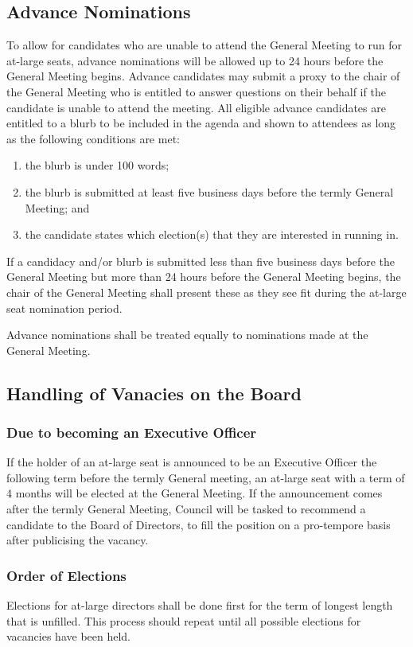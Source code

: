 \subsection{Advance Nominations}
To allow for candidates who are unable to attend the General Meeting to run for at-large seats, advance nominations will be allowed up to 24 hours before the General Meeting begins. 
Advance candidates may submit a proxy to the chair of the General Meeting who is entitled to answer questions on their behalf if the candidate is unable to attend the meeting. 
All eligible advance candidates are entitled to a blurb to be included in the agenda and shown to attendees as long as the following conditions are met: 
\begin{enumerate}
    \item the blurb is under 100 words; 
    \item the blurb is submitted at least five business days before the termly General Meeting; and
    \item the candidate states which election(s) that they are interested in running in.
\end{enumerate}
If a candidacy and/or blurb is submitted less than five business days before the General Meeting but more than 24 hours before the General Meeting begins, the chair of the General Meeting shall present these as they see fit during the at-large seat nomination period. 

\noindent Advance nominations shall be treated equally to nominations made at the General Meeting. 

\subsection{Handling of Vanacies on the Board}
\subsubsection{Due to becoming an Executive Officer}
If the holder of an at-large seat is announced to be an Executive Officer the following term before the termly General meeting, an at-large seat with a term of 4 months will be elected at the General Meeting. 
If the announcement comes after the termly General Meeting, Council will be tasked to recommend a candidate to the Board of Directors, to fill the position on a pro-tempore basis after publicising the vacancy.

\subsubsection{Order of Elections}
Elections for at-large directors shall be done first for the term of longest length that is unfilled. 
This process should repeat until all possible elections for vacancies have been held. 

